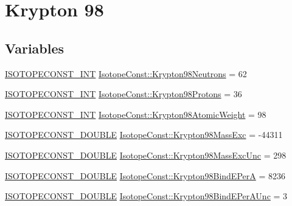 \hypertarget{group___isotope_const-_krypton-_kr98}{}\section{Krypton 98}
\label{group___isotope_const-_krypton-_kr98}
\subsection*{Variables}
\begin{DoxyCompactItemize}
\item 
\mbox{\hyperlink{group___isotope_const-_macros_ga5f18360b3e99483a35c32d789e62621c}{I\+S\+O\+T\+O\+P\+E\+C\+O\+N\+S\+T\+\_\+\+I\+NT}} \mbox{\hyperlink{group___isotope_const-_krypton-_kr98_ga21d2309af95831db26c6d30a401f00db}{Isotope\+Const\+::\+Krypton98\+Neutrons}} = 62
\item 
\mbox{\hyperlink{group___isotope_const-_macros_ga5f18360b3e99483a35c32d789e62621c}{I\+S\+O\+T\+O\+P\+E\+C\+O\+N\+S\+T\+\_\+\+I\+NT}} \mbox{\hyperlink{group___isotope_const-_krypton-_kr98_ga4755659f878dd57ca39ea2f329eae009}{Isotope\+Const\+::\+Krypton98\+Protons}} = 36
\item 
\mbox{\hyperlink{group___isotope_const-_macros_ga5f18360b3e99483a35c32d789e62621c}{I\+S\+O\+T\+O\+P\+E\+C\+O\+N\+S\+T\+\_\+\+I\+NT}} \mbox{\hyperlink{group___isotope_const-_krypton-_kr98_ga64cda3349173ec1558b5dd545dade1c7}{Isotope\+Const\+::\+Krypton98\+Atomic\+Weight}} = 98
\item 
\mbox{\hyperlink{group___isotope_const-_macros_ga8f45a7272ce02c0b4c65c44636ed719a}{I\+S\+O\+T\+O\+P\+E\+C\+O\+N\+S\+T\+\_\+\+D\+O\+U\+B\+LE}} \mbox{\hyperlink{group___isotope_const-_krypton-_kr98_ga25786e6429fde25f303428bed7cec68e}{Isotope\+Const\+::\+Krypton98\+Mass\+Exc}} = -\/44311
\item 
\mbox{\hyperlink{group___isotope_const-_macros_ga8f45a7272ce02c0b4c65c44636ed719a}{I\+S\+O\+T\+O\+P\+E\+C\+O\+N\+S\+T\+\_\+\+D\+O\+U\+B\+LE}} \mbox{\hyperlink{group___isotope_const-_krypton-_kr98_ga3a8fa5064a09c2a6c4d280b677bbf44a}{Isotope\+Const\+::\+Krypton98\+Mass\+Exc\+Unc}} = 298
\item 
\mbox{\hyperlink{group___isotope_const-_macros_ga8f45a7272ce02c0b4c65c44636ed719a}{I\+S\+O\+T\+O\+P\+E\+C\+O\+N\+S\+T\+\_\+\+D\+O\+U\+B\+LE}} \mbox{\hyperlink{group___isotope_const-_krypton-_kr98_ga4d99239546cd69fd87be883677439673}{Isotope\+Const\+::\+Krypton98\+Bind\+E\+PerA}} = 8236
\item 
\mbox{\hyperlink{group___isotope_const-_macros_ga8f45a7272ce02c0b4c65c44636ed719a}{I\+S\+O\+T\+O\+P\+E\+C\+O\+N\+S\+T\+\_\+\+D\+O\+U\+B\+LE}} \mbox{\hyperlink{group___isotope_const-_krypton-_kr98_gaab00be88268f16cd06837954ef3b36fe}{Isotope\+Const\+::\+Krypton98\+Bind\+E\+Per\+A\+Unc}} = 3

\end{DoxyCompactItemize}
